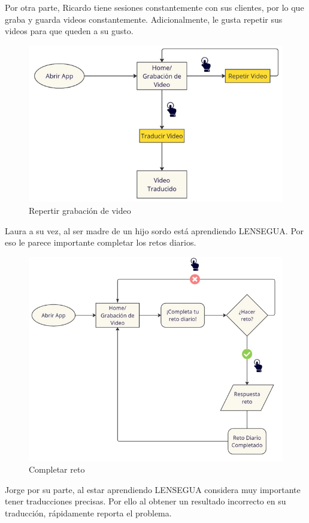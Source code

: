 Por otra parte, Ricardo tiene sesiones constantemente con sus clientes, por lo que graba y guarda videos constantemente. Adicionalmente, le gusta repetir sus videos para que queden a su gusto. 

\begin{figure} [H]
    \centering
    \includegraphics[width=0.7\linewidth]{figuras/flujo_usuario4.png}
    \caption{Repertir grabación de video}
    \label{fig:enter-label}
\end{figure}


Laura a su vez, al ser madre de un hijo sordo está aprendiendo LENSEGUA. Por eso le parece importante completar los retos diarios. 


\begin{figure} [H]
    \centering
    \includegraphics[width=0.75\linewidth]{figuras/flujo_usuario6.png}
    \caption{Completar reto}
    \label{fig:enter-label}
\end{figure}


Jorge por su parte, al estar aprendiendo LENSEGUA considera muy importante tener traducciones precisas. Por ello al obtener un resultado incorrecto en su traducción, rápidamente reporta el problema.

